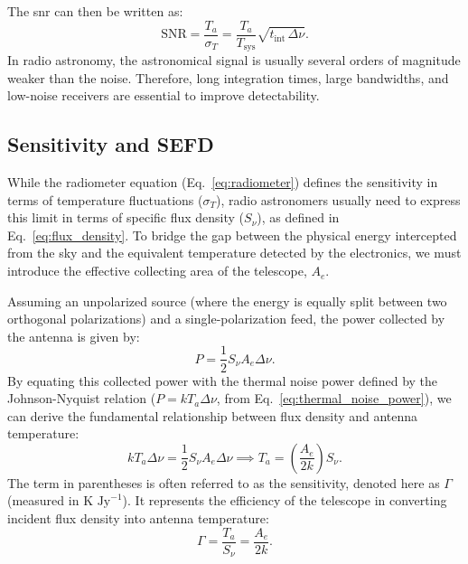 The \gls{snr} can then be written as:  
\begin{equation}
    \text{SNR} = \frac{T_a}{\sigma_T} = \frac{T_a}{T_\text{sys}} \sqrt{t_\text{int} \, \Delta \nu}.
\end{equation}
In radio astronomy, the astronomical signal is usually several orders of magnitude weaker than the noise. Therefore, long integration times, large bandwidths, and low-noise receivers are essential to improve detectability.

\subsection{Sensitivity and SEFD}
While the radiometer equation (Eq.\ \ref{eq:radiometer}) defines the sensitivity in terms of temperature fluctuations ($\sigma_T$), radio astronomers usually need to express this limit in terms of specific flux density ($S_\nu$), as defined in Eq.\ \ref{eq:flux_density}. To bridge the gap between the physical energy intercepted from the sky and the equivalent temperature detected by the electronics, we must introduce the effective collecting area of the telescope, $A_e$.

Assuming an unpolarized source (where the energy is equally split between two orthogonal polarizations) and a single-polarization feed, the power collected by the antenna is given by:
\begin{equation}
    P = \frac{1}{2} S_\nu A_e \Delta \nu.
    \label{eq:power_collected}
\end{equation}
By equating this collected power with the thermal noise power defined by the Johnson-Nyquist relation ($P = k T_a \Delta \nu$, from Eq.\ \ref{eq:thermal_noise_power}), we can derive the fundamental relationship between flux density and antenna temperature:
\begin{equation}
    k T_a \Delta \nu = \frac{1}{2} S_\nu A_e \Delta \nu \implies T_a = \left( \frac{A_e}{2k} \right) S_\nu.
    \label{eq:Ta_flux_relation}
\end{equation}
The term in parentheses is often referred to as the sensitivity, denoted here as $\Gamma$ (measured in $\text{K Jy}^{-1}$). It represents the efficiency of the telescope in converting incident flux density into antenna temperature:
\begin{equation}
    \Gamma = \frac{T_a}{S_\nu} = \frac{A_e}{2k}.
\end{equation}


